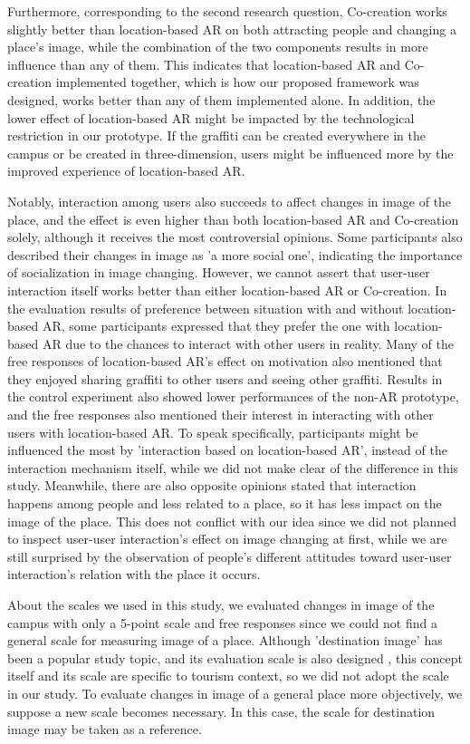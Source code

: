Furthermore, corresponding to the second research question, Co-creation works slightly better than location-based AR on both attracting people and changing a place's image, while the combination of the two components results in more influence than any of them.
This indicates that location-based AR and Co-creation implemented together, which is how our proposed framework was designed, works better than any of them implemented alone.
In addition, the lower effect of location-based AR might be impacted by the technological restriction in our prototype. If the graffiti can be created everywhere in the campus or be created in three-dimension, users might be influenced more by the improved experience of location-based AR.

Notably, interaction among users also succeeds to affect changes in image of the place, and the effect is even higher than both location-based AR and Co-creation solely, although it receives the most controversial opinions.
Some participants also described their changes in image as 'a more social one', indicating the importance of socialization in image changing.
However, we cannot assert that user-user interaction itself works better than either location-based AR or Co-creation.
In the evaluation results of preference between situation with and without location-based AR, some participants expressed that they prefer the one with location-based AR due to the chances to interact with other users in reality.
Many of the free responses of location-based AR's effect on motivation also mentioned that they enjoyed sharing graffiti to other users and seeing other graffiti. 
Results in the control experiment also showed lower performances of the non-AR prototype, and the free responses also mentioned their interest in interacting with other users with location-based AR.
To speak specifically, participants might be influenced the most by 'interaction based on location-based AR', instead of the interaction mechanism itself, while we did not make clear of the difference in this study.
Meanwhile, there are also opposite opinions stated that interaction happens among people and less related to a place, so it has less impact on the image of the place.
This does not conflict with our idea since we did not planned to inspect user-user interaction's effect on image changing at first, while we are still surprised by the observation of people's different attitudes toward user-user interaction's relation with the place it occurs.

About the scales we used in this study, we evaluated changes in image of the campus with only a 5-point scale and free responses since we could not find a general scale for measuring image of a place.
Although 'destination image' has been a popular study topic, and its evaluation scale is also designed \cite{byon_zhang_2010}, this concept itself and its scale are specific to tourism context, so we did not adopt the scale in our study.
To evaluate changes in image of a general place more objectively, we suppose a new scale becomes necessary. In this case, the scale for destination image may be taken as a reference.

